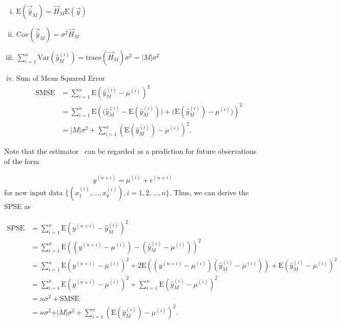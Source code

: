 \begin{enumerate}[(i)]%
	\item $\text{E} (\vec{\hat{y}}_M) = \vec{H}_M \text{E}(\vec{y})$ 
	\item $\text{Cov} (\vec{\hat{y}}_M) = \sigma^2 \vec{H}_M$
	\item $\sum_{i=1}^n \text{Var}(\hat y^{(i)}_M) =  \text{trace}(\vec{H}_M) \sigma^2 = \vert M \vert \sigma^2 $
	\item Sum of Mean Squared Error
		\begin{equation} 
		\begin{split} 
		\text{SMSE} &= \sum_{i=1}^n \text{E}\left(\hat y^{(i)}_M - \mu^{(i)}\right)^2 \\
				    &= \sum_{i=1}^n \text{E}\left( \big( \hat y^{(i)}_M - \text{E}(\hat y^{(i)}_M) \big) + \big(\text{E}(\hat y^{(i)}_M) - \mu^{(i)} \big) \right)^2 \\
				    &= \vert M \vert\sigma^2 + \sum_{i=1}^n \left( \text{E}(\hat y^{(i)}_M) - \mu^{(i)} \right)^2.
		\end{split}
		\end{equation}
\end{enumerate}

Note that the estimator~ can be regarded as a prediction for future observations of the form

\begin{align}
	y^{(n+i)} = \mu^{(i)} + \epsilon^{(n+i)}
\end{align}
%
for new input data $\{(x_1^{(i)}, \dots, x_q^{(i)}), i=1,2,\dots,n\}$. Thus, we can derive the SPSE as

\begin{equation}
\begin{split}
	\text{SPSE} &= \sum_{i=1}^{n} \text{E}\left(y^{(n+i)} - \hat y^{(i)}_M\right)^2 \\ 
				&= \sum_{i=1}^{n} \text{E}\left((y^{(n+i)} - \mu^{(i)}) - (\hat y^{(i)}_M - \mu^{(i)})\right)^2 \\ 
				&= \sum_{i=1}^{n} \text{E}\left(y^{(n+i)} - \mu^{(i)}\right)^2 + 2\text{E} \left( (y^{(n+i)} - \mu^{(i)})(\hat y^{(i)}_M - \mu^{(i)}) \right) + \text{E}\left(\hat y^{(i)}_M - \mu^{(i)}\right)^2 \\
				&= \sum_{i=1}^{n}\text{E}\left(y^{(n+i)} - \mu^{(i)}\right)^2 + \sum_{i=1}^{n} \text{E}\left( \hat y^{(i)}_M - \mu^{(i)} \right)^2 \\ 
				&= n\sigma^2 + \text{SMSE} \\ 
				&= n\sigma^2 + \vert M \vert \sigma^2 + \sum_{i=1}^{n} \left(\text{E}(\hat y^{(i)}_M) - \mu^{(i)} \right)^2.
\end{split}
\end{equation}

